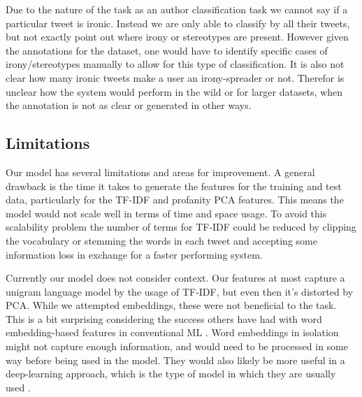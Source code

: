 

Due to the nature of the task as an author classification task we cannot say if a particular tweet is ironic. Instead we are only able to classify by all their tweets, but not exactly point out where irony or stereotypes are present. However given the annotations for the dataset, one would have to identify specific cases of irony/stereotypes manually to allow for this type of classification. It is also not clear how many ironic tweets make a user an irony-spreader or not. Therefor is unclear how the system would perform in the wild or for larger datasets, when the annotation is not as clear or generated in other ways. 
 
\subsection{Limitations}

Our model has several limitations and areas for improvement. A general drawback is the time it takes to generate the features for the training and test data, particularly for the TF-IDF and profanity PCA features. This means the model would not scale well in terms of time and space usage. To avoid this scalability problem the number of terms for TF-IDF could be reduced by clipping the vocabulary or stemming the words in each tweet and accepting some information loss in exchange for a faster performing system.

Currently our model does not consider context. Our features at most capture a unigram language model by the usage of TF-IDF, but even then it's distorted by PCA. While we attempted embeddings, these were not beneficial to the task. This is a bit surprising considering the success others have had with word embedding-based features in conventional ML \cite{joshi2016word}. Word embeddings in isolation might not capture enough information, and would need to be processed in some way before being used in the model. They would also likely be more useful in a deep-learning approach, which is the type of model in which they are usually used \cite{zhang2019irony, sarcasm_detection}.

